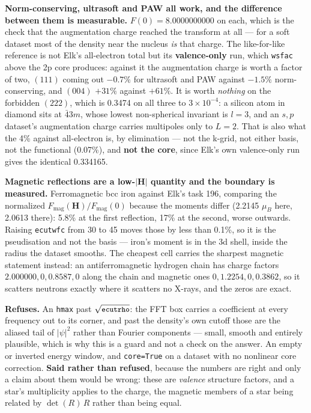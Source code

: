 \documentclass[11pt,a4paper]{article}
\newcommand{\code}[1]{\texttt{\small #1}}
\begin{document}
\textbf{Norm-conserving, ultrasoft and PAW all work, and the difference between
them is measurable.} $F(0) = 8.0000000000$ on each, which is the check that the
augmentation charge reached the transform at all --- for a soft dataset most of
the density near the nucleus \emph{is} that charge. The like-for-like reference
is not Elk's all-electron total but its \textbf{valence-only} run, which
\code{wsfac} above the 2p core produces: against it the augmentation charge is
worth a factor of two, $(111)$ coming out $-0.7\%$ for ultrasoft and PAW against
$-1.5\%$ norm-conserving, and $(004)$ $+31\%$ against $+61\%$. It is worth
\emph{nothing} on the forbidden $(222)$, which is 0.3474 on all three to
$3\times10^{-4}$: a silicon atom in diamond sits at $\bar 4 3m$, whose lowest
non-spherical invariant is $l = 3$, and an $s,p$ dataset's augmentation charge
carries multipoles only to $L = 2$. That is also what the 4\% against
all-electron is, by elimination --- not the k-grid, not either basis, not the
functional (0.07\%), and \textbf{not the core}, since Elk's own valence-only run
gives the identical 0.334165.

\textbf{Magnetic reflections are a low-$|\mathbf H|$ quantity and the boundary is
measured.} Ferromagnetic bcc iron against Elk's task 196, comparing the
normalized $F_{\mathrm{mag}}(\mathbf H)/F_{\mathrm{mag}}(0)$ because the moments
differ (2.2145 $\mu_B$ here, 2.0613 there): 5.8\% at the first reflection, 17\%
at the second, worse outwards. Raising \code{ecutwfc} from 30 to 45 moves those
by less than 0.1\%, so it is the pseudisation and not the basis --- iron's moment
is in the 3d shell, inside the radius the dataset smooths. The cheapest cell
carries the sharpest magnetic statement instead: an antiferromagnetic hydrogen
chain has charge factors $2.000000, 0, 0.8587, 0$ along the chain and magnetic
ones $0, 1.2254, 0, 0.3862$, so it scatters neutrons exactly where it scatters
no X-rays, and the zeros are exact.

\begin{refuses}
\textbf{Refuses.} An \code{hmax} past $\sqrt{\code{ecutrho}}$: the FFT box
carries a coefficient at every frequency out to its corner, and past the density's
own cutoff those are the aliased tail of $|\psi|^2$ rather than Fourier
components --- small, smooth and entirely plausible, which is why this is a guard
and not a check on the answer. An empty or inverted energy window, and
\code{core=True} on a dataset with no nonlinear core correction.
\textbf{Said rather than refused}, because the numbers are right and only a
claim about them would be wrong: these are \emph{valence} structure factors, and
a star's multiplicity applies to the charge, the magnetic members of a star
being related by $\det(R)\,R$ rather than being equal.
\end{refuses}
\end{document}
